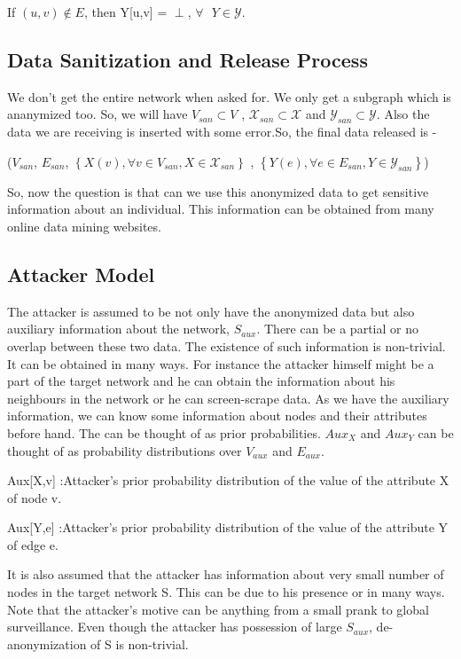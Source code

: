 \documentclass[preprint,12pt]{elsarticle}
\theoremstyle{definition}
\theoremstyle{remark}
\begin{document}
If $(u,v) \not \in E$, then Y[u,v] = $\perp$, $\forall \text{ }Y \in \mathcal{Y}$.

\subsection{Data Sanitization and Release Process}
We don't get the entire network when asked for. We only get a subgraph which is ananymized too. So, we will have $V_{san} \subset V$ , $\mathcal{X}_{san} \subset \mathcal{X}$ and $\mathcal{Y}_{san} \subset \mathcal{Y}$. Also the data we are receiving is inserted with some error.So, the final data released is - 

\begin{center}
($V_{san}$, $E_{san}$, $\left\lbrace X(v), \forall v \in V_{san}, X \in \mathcal{X}_{san} \right\rbrace$ , $\left\lbrace Y(e), \forall e \in E_{san}, Y \in \mathcal{Y}_{san} \right\rbrace$)
\end{center}

So, now the question is that can we use this anonymized data to get sensitive information about an individual. This information can be obtained from many online data mining websites.

\subsection{Attacker Model}
The attacker is assumed to be not only have the anonymized data but also auxiliary information about the network, $S_{aux}$. There can be a partial or no overlap between these two data. The existence of such information is non-trivial. It can be obtained in many ways. For instance the attacker himself might be a part of the target network and he can obtain the information about his neighbours in the network or he can screen-scrape data. As we have the auxiliary information, we can know some information about nodes and their attributes before hand. The can be thought of as prior probabilities. $Aux_{X}$ and $Aux_{Y}$ can be thought of as probability distributions over $V_{aux}$ and $E_{aux}$.

\begin{flushleft}
Aux[X,v] :Attacker's prior probability distribution of the value of the attribute X of node v.

Aux[Y,e] :Attacker's prior probability distribution of the value of the attribute Y of edge e.
\end{flushleft}

It is also assumed that the attacker has information about very small number of nodes in the target network S. This can be due to his presence or in many ways. Note that the attacker's motive can be anything from a small prank to global surveillance. Even though the attacker has possession of large $S_{aux}$, de-anonymization of S is non-trivial.
\end{document}
